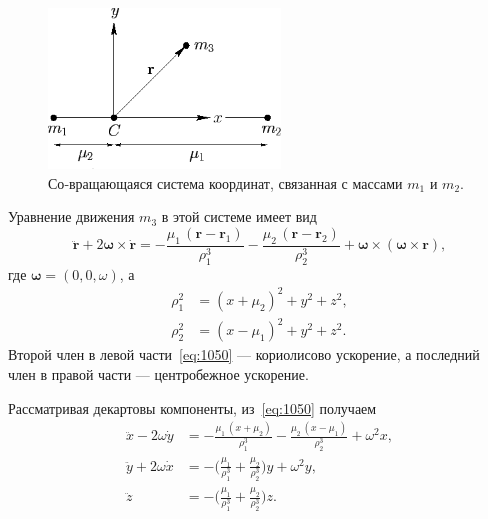 \documentclass[12pt]{article}
\newcommand{\rvec}{\mathbf r}
\newcommand{\rone}{\mathbf r_1}
\newcommand{\rtwo}{\mathbf r_2}
\newcommand{\omegav}{\boldsymbol{\omega}}
\newcommand{\muone}{\mu_1}
\newcommand{\mutwo}{\mu_2}
\begin{document}
\begin{figure}[H]
  \centering
  \includegraphics[width=0.55\textwidth]{image1.png}
  \caption{Со‑вращающаяся система координат, связанная с массами $m_1$ и $m_2$.}
  \label{fig:corot}
\end{figure}

Уравнение движения $m_3$ в этой системе имеет вид
\begin{equation}\tag{1050}\label{eq:1050}
  \ddot{\rvec}+2\omegav\times\dot{\rvec}
  = -\frac{\muone\,(\rvec-\rone)}{\rho_1^{3}}
    -\frac{\mutwo\,(\rvec-\rtwo)}{\rho_2^{3}}
    +\omegav\times(\omegav\times \rvec),
\end{equation}
где $\omegav=(0,0,\omega)$, а
\begin{align}\tag{1051}\label{eq:rho1}
  \rho_1^{2} &= (x+\mutwo)^2 + y^{2}+z^{2},\\[2pt]
  \rho_2^{2} &= (x-\muone)^2 + y^{2}+z^{2}.\tag{1052}\label{eq:rho2}
\end{align}
Второй член в левой части~\eqref{eq:1050} — кориолисово ускорение, а последний член в правой части — центробежное ускорение.

Рассматривая декартовы компоненты, из~\eqref{eq:1050} получаем
\begin{align}\tag{1053}\label{eq:1053}
  \ddot x - 2\omega\dot y &= -\frac{\muone\,(x+\mutwo)}{\rho_1^{3}}-\frac{\mutwo\,(x-\muone)}{\rho_2^{3}}+\omega^{2}x,\\[2pt]
\tag{1054}\label{eq:1054}
  \ddot y + 2\omega\dot x &= -\biggl(\frac{\muone}{\rho_1^{3}}+\frac{\mutwo}{\rho_2^{3}}\biggr)y + \omega^{2}y,\\[2pt]
\tag{1055}\label{eq:1055}
  \ddot z &= -\biggl(\frac{\muone}{\rho_1^{3}}+\frac{\mutwo}{\rho_2^{3}}\biggr)z.
\end{align}
\end{document}
